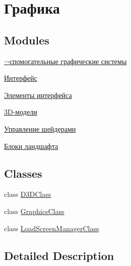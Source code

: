 \hypertarget{group___graphics}{}\section{Графика}
\label{group___graphics}
\subsection*{Modules}
\begin{DoxyCompactItemize}
\item 
\hyperlink{group___systems}{¬спомогательные графические системы}
\item 
\hyperlink{group___interface}{Интерфейс}
\item 
\hyperlink{group___interface_elements}{Элементы интерфейса}
\item 
\hyperlink{group___models}{3\+D-\/модели}
\item 
\hyperlink{group___shader_managment}{Управление шейдерами}
\item 
\hyperlink{group___blocks}{Блоки ландшафта}
\end{DoxyCompactItemize}
\subsection*{Classes}
\begin{DoxyCompactItemize}
\item 
class \hyperlink{class_d3_d_class}{D3\+D\+Class}
\item 
class \hyperlink{class_graphics_class}{Graphics\+Class}
\item 
class \hyperlink{class_load_screen_manager_class}{Load\+Screen\+Manager\+Class}
\end{DoxyCompactItemize}


\subsection{Detailed Description}
